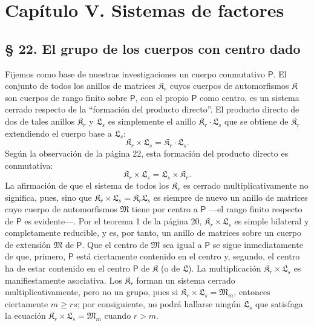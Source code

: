 \section*{Capítulo V. Sistemas de factores}\label{kapitel-v.-faktorensysteme}

\subsection*{§ 22. El grupo de los cuerpos con centro dado}\label{die-gruppe-der-koerper-mit-gegebenem-zentrum}

Fijemos como base de nuestras investigaciones un cuerpo conmutativo \(\mathsf P\). El conjunto de todos los anillos de matrices \(\mathfrak K_r\) cuyos cuerpos de automorfismos \(\mathfrak K\) son cuerpos de rango finito sobre \(\mathsf P\), con el propio \(\mathsf P\) como centro, es un sistema cerrado respecto de la ``formación del producto directo''. El producto directo de dos de tales anillos \(\mathfrak K_r\) y \(\mathfrak L_s\) es simplemente el anillo \(\mathfrak K_r\cdot\mathfrak L_s\) que se obtiene de \(\mathfrak K_r\) extendiendo el cuerpo base a \(\mathfrak L_s\):
\[
\mathfrak K_r\times\mathfrak L_s=\mathfrak K_r\cdot\mathfrak L_s.
\]
Según la observación de la página 22, esta formación del producto directo es conmutativa:
\[
\mathfrak K_r\times\mathfrak L_s=\mathfrak L_s\times\mathfrak K_r.
\]
La afirmación de que el sistema de todos los \(\mathfrak K_r\) es cerrado multiplicativamente no significa, pues, sino que \(\mathfrak K_r\times\mathfrak L_s=\mathfrak K_r\mathfrak L_s\) es siempre de nuevo un anillo de matrices cuyo cuerpo de automorfismos \(\mathfrak M\) tiene por centro a \(\mathsf P\) ---el rango finito respecto de \(\mathsf P\) es evidente---. Por el teorema 1 de la página 20, \(\mathfrak K_r\times\mathfrak L_s\) es simple bilateral y completamente reducible, y es, por tanto, un anillo de matrices sobre un cuerpo de extensión \(\mathfrak M\) de \(\mathsf P\). Que el centro de \(\mathfrak M\) sea igual a \(\mathsf P\) se sigue inmediatamente de que, primero, \(\mathsf P\) está ciertamente contenido en el centro y, segundo, el centro ha de estar contenido en el centro \(\mathsf P\) de \(\mathfrak K\) (o de \(\mathfrak L\)). La multiplicación \(\mathfrak K_r\times\mathfrak L_s\) es manifiestamente asociativa. Los \(\mathfrak K_r\) forman un sistema cerrado multiplicativamente, pero no un grupo, pues si \(\mathfrak K_r\times\mathfrak L_s=\mathfrak M_m\), entonces ciertamente \(m\geq rs\); por consiguiente, no podrá hallarse ningún \(\mathfrak L_s\) que satisfaga la ecuación \(\mathfrak K_r\times\mathfrak L_s=\mathfrak M_m\) cuando \(r>m\).

